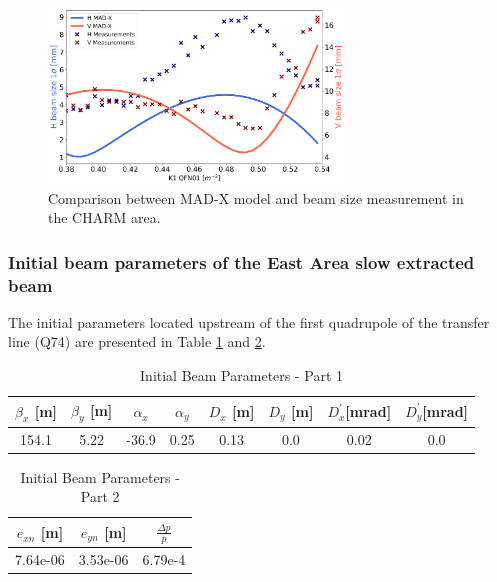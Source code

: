 \begin{figure}[htbp]
\centering
\includegraphics[width=0.7\textwidth]{03_Empirical_Measurements/images/east_quad_scan_df_meas_btv96.pickle.png}
\caption{Comparison between MAD-X model and beam size measurement in the CHARM area.}
\label{fig:comparison_btv96}
\end{figure}


\newpage
\subsubsection{Initial beam parameters of the East Area slow extracted beam}
\label{initial beam parameters empirical}

The initial parameters located upstream of the first quadrupole of the transfer line (Q74) are presented in Table \ref{table:beam_parameters_1} and \ref{table:beam_parameters_2}.


\begin{table}[htbp]
\centering
\caption{Initial Beam Parameters - Part 1}
\label{table:beam_parameters_1}
\begin{tabular}{|c|c|c|c|c|c|c|c|}
\hline
$\beta_{x}$ [m] & $\beta_{y}$ [m] & $\alpha_{x}$ & $\alpha_{y}$ & $D_{x}$ [m] & $D_{y}$ [m] & $D^{'}_{x}$[mrad] & $D^{'}_{y}$[mrad] \\
\hline
154.1 & 5.22 & -36.9 & 0.25 & 0.13 & 0.0 & 0.02 & 0.0 \\
\hline
\end{tabular}
\end{table}

\begin{table}[htbp]
\centering
\caption{Initial Beam Parameters - Part 2}
\label{table:beam_parameters_2}
\begin{tabular}{|c|c|c|}
\hline
$e_{xn}$ [m] & $e_{yn}$ [m] & $\frac{\Delta p}{p}$ \\
\hline
7.64e-06 & 3.53e-06 & 6.79e-4 \\
\hline
\end{tabular}
\end{table}


